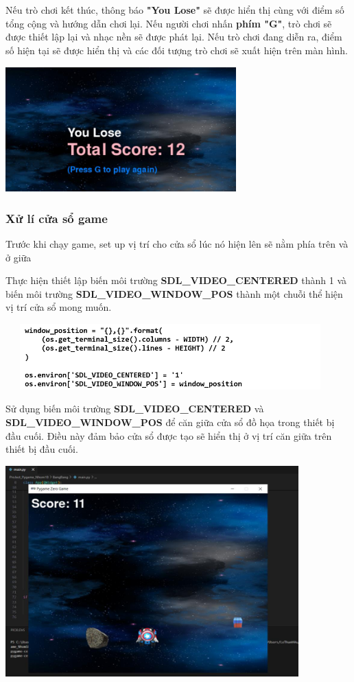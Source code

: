 \documentclass[a4paper]{article}
\begin{document}
Nếu trò chơi kết thúc, thông báo \textbf{"You Lose"} sẽ được hiển thị
cùng với điểm số tổng cộng và hướng dẫn chơi lại. Nếu người chơi nhấn
\textbf{phím "G"}, trò chơi sẽ được thiết lập lại và nhạc nền sẽ được phát lại. Nếu trò chơi đang diễn ra, điểm số hiện tại sẽ được hiển thị và các đối tượng trò chơi sẽ xuất hiện trên màn hình.

\includegraphics[width=3.49861in,height=1.89305in]{image14.png}

\subsubsection{Xử lí cửa sổ game}
Trước khi chạy game, set up vị trí cho cửa sổ lúc nó hiện lên sẽ nằm
phía trên và ở giữa

Thực hiện thiết lập biến môi trường \textbf{SDL\_VIDEO\_CENTERED} thành
1 và biến môi trường \textbf{SDL\_VIDEO\_WINDOW\_POS} thành một chuỗi
thể hiện vị trí cửa sổ mong muốn.

\includegraphics[width=5in,height=1in]{image14_1.png}

Sử dụng biến môi trường \textbf{SDL\_VIDEO\_CENTERED} và
\textbf{SDL\_VIDEO\_WINDOW\_POS} để căn giữa cửa sổ đồ họa trong thiết bị đầu cuối. Điều này đảm bảo cửa sổ được tạo sẽ hiển thị ở vị trí căn giữa trên thiết bị đầu cuối.

\includegraphics[width=4.44305in,height=3.19722in]{image15.png}
\end{document}
